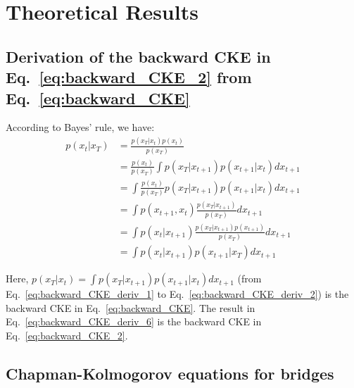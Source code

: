 
\section{Theoretical Results}

\subsection{Derivation of the backward CKE in Eq.~\ref{eq:backward_CKE_2} from
Eq.~\ref{eq:backward_CKE}\label{subsec:Derivation-of-the-backward-CKE}}

\noindent According to Bayes' rule, we have:
\begin{align}
p\left(x_{t}|x_{T}\right) & =\frac{p\left(x_{T}|x_{t}\right)p\left(x_{t}\right)}{p\left(x_{T}\right)}\label{eq:backward_CKE_deriv_1}\\
 & =\frac{p\left(x_{t}\right)}{p\left(x_{T}\right)}\int p\left(x_{T}|x_{t+1}\right)p\left(x_{t+1}|x_{t}\right)dx_{t+1}\label{eq:backward_CKE_deriv_2}\\
 & =\int\frac{p\left(x_{t}\right)}{p\left(x_{T}\right)}p\left(x_{T}|x_{t+1}\right)p\left(x_{t+1}|x_{t}\right)dx_{t+1}\\
 & =\int p\left(x_{t+1},x_{t}\right)\frac{p\left(x_{T}|x_{t+1}\right)}{p\left(x_{T}\right)}dx_{t+1}\\
 & =\int p\left(x_{t}|x_{t+1}\right)\frac{p\left(x_{T}|x_{t+1}\right)p\left(x_{t+1}\right)}{p\left(x_{T}\right)}dx_{t+1}\\
 & =\int p\left(x_{t}|x_{t+1}\right)p\left(x_{t+1}|x_{T}\right)dx_{t+1}\label{eq:backward_CKE_deriv_6}
\end{align}

Here, $p\left(x_{T}|x_{t}\right)=\int p\left(x_{T}|x_{t+1}\right)p\left(x_{t+1}|x_{t}\right)dx_{t+1}$
(from Eq.~\ref{eq:backward_CKE_deriv_1} to Eq.~\ref{eq:backward_CKE_deriv_2})
is the backward CKE in Eq.~\ref{eq:backward_CKE}. The result in
Eq.~\ref{eq:backward_CKE_deriv_6} is the backward CKE in Eq.~\ref{eq:backward_CKE_2}.

\subsection{Chapman-Kolmogorov equations for bridges\label{subsec:Proof_Chapman-Kolmogorov-equations-for-bridges}}


